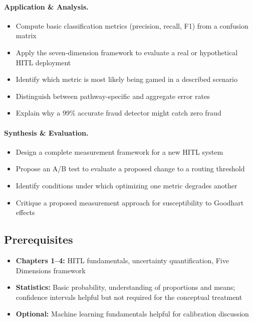 \paragraph{Application \& Analysis.}
\begin{itemize}
    \item Compute basic classification metrics (precision, recall, F1) from a confusion matrix
    \item Apply the seven-dimension framework to evaluate a real or hypothetical HITL deployment
    \item Identify which metric is most likely being gamed in a described scenario
    \item Distinguish between pathway-specific and aggregate error rates
    \item Explain why a 99\% accurate fraud detector might catch zero fraud
\end{itemize}

\paragraph{Synthesis \& Evaluation.}
\begin{itemize}
    \item Design a complete measurement framework for a new HITL system
    \item Propose an A/B test to evaluate a proposed change to a routing threshold
    \item Identify conditions under which optimizing one metric degrades another
    \item Critique a proposed measurement approach for susceptibility to Goodhart effects
\end{itemize}

\subsection{Prerequisites}
\begin{itemize}
    \item \textbf{Chapters 1--4:} HITL fundamentals, uncertainty quantification, Five Dimensions framework
    \item \textbf{Statistics:} Basic probability, understanding of proportions and means; confidence intervals helpful but not required for the conceptual treatment
    \item \textbf{Optional:} Machine learning fundamentals helpful for calibration discussion
\end{itemize}

